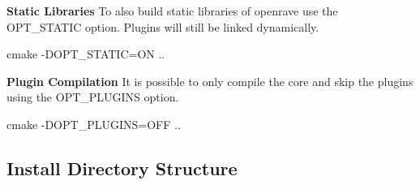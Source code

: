 \begin{DoxyItemize}
\item {\bfseries Static Libraries} To also build static libraries of openrave use the {\ttfamily OPT\_\-STATIC} option. Plugins will still be linked dynamically. \begin{DoxyVerb}
cmake -DOPT_STATIC=ON ..
\end{DoxyVerb}

\end{DoxyItemize}


\begin{DoxyItemize}
\item {\bfseries Plugin Compilation} It is possible to only compile the core and skip the plugins using the {\ttfamily OPT\_\-PLUGINS} option. \begin{DoxyVerb}
cmake -DOPT_PLUGINS=OFF ..
\end{DoxyVerb}

\end{DoxyItemize}\hypertarget{installation_install_structure}{}\subsection{Install Directory Structure}\label{installation_install_structure}

